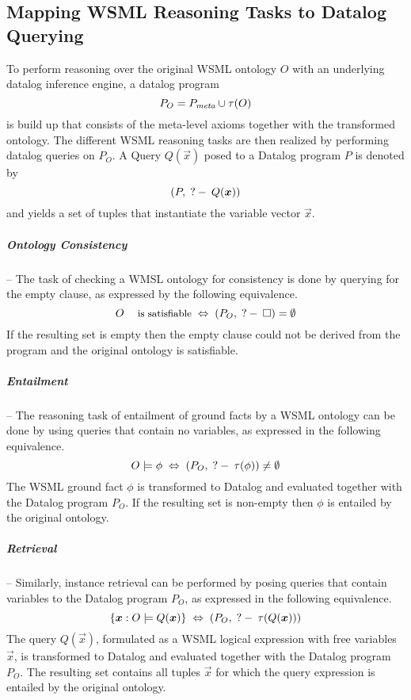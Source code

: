 \subsection{Mapping WSML Reasoning Tasks to Datalog Querying}

To perform reasoning over the original WSML ontology $O$ with an
underlying datalog inference engine, a datalog program
\begin{displaymath}
    P_O = P_{\textit{\scriptsize{meta}}} \cup \tau(O)
\end{displaymath}
is build up that consists of the meta-level axioms together with
the transformed ontology. The different WSML reasoning tasks are
then realized by performing datalog queries on $P_O$. A Query
$Q(\vec{x})$ posed to a Datalog program $P$ is denoted by
$$(P,\qury Q(\vec{x}))$$ and yields a set of tuples that instantiate
the variable vector $\vec{x}$.

\subparagraph{Ontology Consistency} -- The task of checking a WMSL
ontology for consistency is done by querying for the empty clause,
as expressed by the following equivalence.
\begin{displaymath}
    O \; \textrm{\footnotesize{is satisfiable}} \; \Leftrightarrow \; (P_O , \qury \square) =
    \emptyset
\end{displaymath}
If the resulting set is empty then the empty clause could not be
derived from the program and the original ontology is satisfiable.

\subparagraph{Entailment} -- The reasoning task of entailment of
ground facts by a WSML ontology can be done by using queries that
contain no variables, as expressed in the following equivalence.
\begin{displaymath}
    O \models \phi \; \Leftrightarrow \; (P_O, \;?-\:
    \tau(\phi)) \not= \emptyset
\end{displaymath}
The WSML ground fact $\phi$ is transformed to Datalog and
evaluated together with the Datalog program $P_O$. If the
resulting set is non-empty then $\phi$ is entailed by the original
ontology.

\subparagraph{Retrieval} -- Similarly, instance retrieval can be
performed by posing queries that contain variables to the Datalog
program $P_O$, as expressed in the following equivalence.
\begin{displaymath}
    \{\vec{x} : O \models Q(\vec{x})\} \; \Leftrightarrow \; (P_O, \qury \tau(Q(\vec{x})))
\end{displaymath}
The query $Q(\vec{x})$, formulated as a WSML logical expression
with free variables $\vec{x}$, is transformed to Datalog and
evaluated together with the Datalog program $P_O$. The resulting
set contains all tuples $\vec{x}$ for which the query expression
is entailed by the original ontology.

